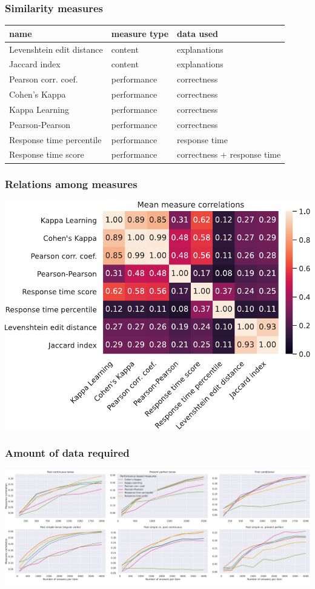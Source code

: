 \documentclass[bigger, aspectratio=169]{beamer}
\begin{document}
\begin{frame}
	\frametitle{Similarity measures}
	\centering
	\begin{tabular}{lll}
		\toprule
		name & measure type & data used \\
		\midrule
		Levenshtein edit distance & content & explanations \\
		Jaccard index & content & explanations \\
		Pearson corr. coef. & performance & correctness \\
		Cohen's Kappa & performance & correctness \\
		Kappa Learning & performance & correctness \\
		Pearson-Pearson & performance & correctness \\
		Response time percentile & performance & response time \\
		Response time score & performance & correctness + response time \\
		\bottomrule
	\end{tabular}
\end{frame}

\begin{frame}
	\frametitle{Relations among measures}
	\begin{center}
		\includegraphics[width=0.7\linewidth]{figures/heatmap_mean_correlations}
	\end{center}
\end{frame}


\begin{frame}
	\frametitle{Amount of data required}
	\begin{center}
		\includegraphics[width=1\linewidth]{figures/perf_jaccard_corrs}
	\end{center}
\end{frame}
\end{document}
